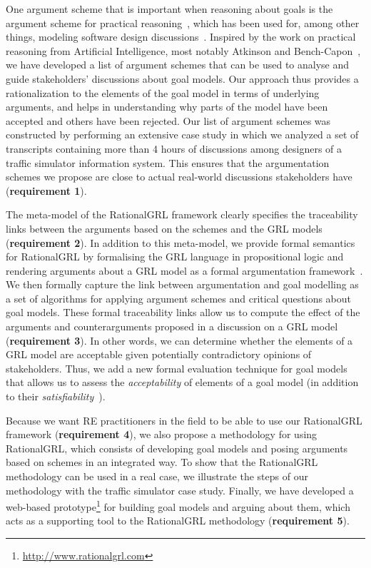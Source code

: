 One argument scheme that is important when reasoning about goals is the argument scheme for practical reasoning~\cite{walton1990,atkinson2007}, which has been used for, among other things, modeling software design discussions~\cite{BlackEtal2013}. Inspired by the work on practical reasoning from Artificial Intelligence, most notably Atkinson and Bench-Capon~\cite{atkinson2007}, we have developed a list of argument schemes that can be used to analyse and guide stakeholders' discussions about goal models. Our approach thus provides a rationalization to the elements of the goal model in terms of underlying arguments, and helps in understanding why parts of the model have been accepted and others have been rejected. Our list of argument schemes was constructed by performing an extensive case study in which we analyzed a set of transcripts containing more than 4 hours of discussions among designers of a traffic simulator information system. This ensures that the argumentation schemes we propose are close to actual real-world discussions stakeholders have (\textbf{requirement 1}).  

The meta-model of the RationalGRL framework clearly specifies the traceability links between the arguments based on the schemes and the GRL models (\textbf{requirement 2}). In addition to this meta-model, we provide formal semantics for RationalGRL by formalising the GRL language in propositional logic and rendering arguments about a GRL model as a formal argumentation framework~\cite{Dung1995}. We then formally capture the link between argumentation and goal modelling as a set of algorithms for applying argument schemes and critical questions about goal models. These formal traceability links allow us to compute the effect of the arguments and counterarguments proposed in a discussion on a GRL model (\textbf{requirement 3}). In other words, we can determine whether the elements of a GRL model are acceptable given potentially contradictory opinions of stakeholders. Thus, we add a new formal evaluation technique for goal models that allows us to assess the \emph{acceptability} of elements of a goal model (in addition to their \emph{satisfiability}~\cite{Amyot:2010:EGM:1841349.1841356}).

Because we want RE practitioners in the field to be able to use our RationalGRL framework (\textbf{requirement 4}), we also propose a methodology for using RationalGRL, which consists of developing goal models and posing arguments based on schemes in an integrated way. To show that the RationalGRL methodology can be used in a real case, we illustrate the steps of our methodology with the traffic simulator case study. Finally, we have developed a web-based prototype\footnote{\url{http://www.rationalgrl.com}} for building goal models and arguing about them, which acts as a supporting tool to the RationalGRL methodology (\textbf{requirement 5}). 

